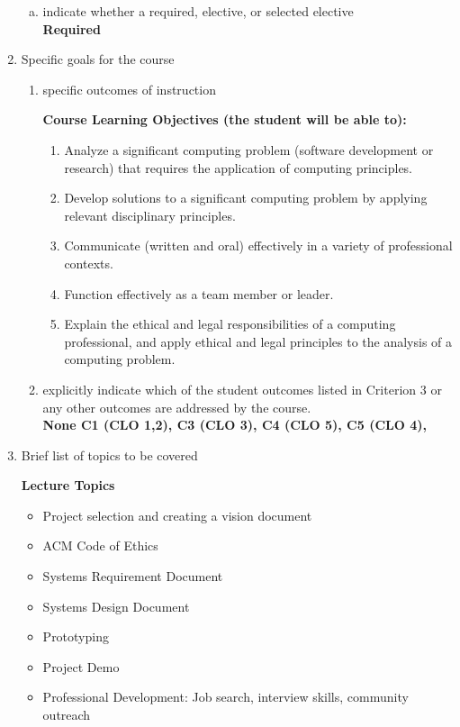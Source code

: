 \begin{enumerate}[1.]
\begin{enumerate}[a.]
\item indicate whether a required, elective, or selected elective\\ %
  {\bfseries
    Required
  }

\end{enumerate}

\item Specific goals for the course
\begin{enumerate}
\item specific outcomes of instruction\\ %
  {\bfseries
    Course Learning Objectives (the student will be able to):
    \begin{enumerate}
      \item Analyze a significant computing problem (software development or research) that requires the application
      of computing principles.
      \item Develop solutions to a significant computing problem by applying relevant disciplinary principles.
      \item Communicate (written and oral) effectively in a variety of professional contexts.
      \item Function effectively as a team member or leader.
      \item Explain the ethical and legal responsibilities of a computing professional, and apply ethical and legal
      principles to the analysis of a computing problem.
   \end{enumerate}
  }

\item explicitly indicate which of the student outcomes listed in Criterion 3 or any other outcomes are addressed by the course.\\
  {\bfseries
    None
    C1 (CLO 1,2),
    C3 (CLO 3),
    C4 (CLO 5),
    C5 (CLO 4),
  }
\end{enumerate}

\item Brief list of topics to be covered\\
  {\bfseries
    Lecture Topics
    \begin{itemize}
      \item Project selection and creating a vision document
      \item ACM Code of Ethics
      \item Systems Requirement Document
      \item Systems Design Document
      \item Prototyping
      \item Project Demo
      \item Professional Development: Job search, interview skills, community outreach
    \end{itemize}
  }


\end{enumerate}

